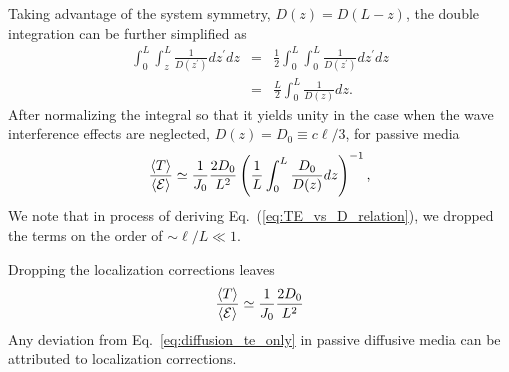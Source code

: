 Taking advantage of the system symmetry, $D(z)=D(L-z)$, the double integration can be further simplified as
\begin{eqnarray}
\displaystyle\int_{0}^{L}\int_{z}^{L}\displaystyle\frac{1}{D(z^\prime)}dz^\prime dz &=&\frac{1}{2}\displaystyle\int_{0}^{L}\int_{0}^{L}\displaystyle\frac{1}{D(z^\prime)}dz^\prime dz \nonumber\\
&=&\frac{L}{2}\int_{0}^{L}\displaystyle\frac{1}{D(z)}dz.
\label{eq:E3_relation}
\end{eqnarray}
After normalizing the integral so that it yields unity in the case when the wave interference effects are neglected, $D(z)=D_0\equiv c\ell/3$, for passive media
\begin{equation}
\frac{\langle T \rangle}{\langle {\cal E} \rangle}\simeq
\frac{1}{J_0}
\frac{2D_0}{L^2}
\left(
\displaystyle\frac{1}{L}\displaystyle\int_{0}^{L}\displaystyle\frac{D_0}{D(z)}dz
\right)^{-1},
\label{eq:TE_vs_D_relation}
\end{equation}
We note that in process of deriving Eq.~(\ref{eq:TE_vs_D_relation}), we dropped the terms on the order of $\sim\ell/L\ll 1$.

Dropping the localization corrections leaves
\begin{equation}
\frac{\langle T \rangle}{\langle {\cal E} \rangle}\simeq \frac{1}{J_0} \frac{2D_0}{L^2}
\label{eq:diffusion_te_only}
\end{equation}
Any deviation from Eq.~\ref{eq:diffusion_te_only} in passive diffusive media can be attributed to localization corrections.
